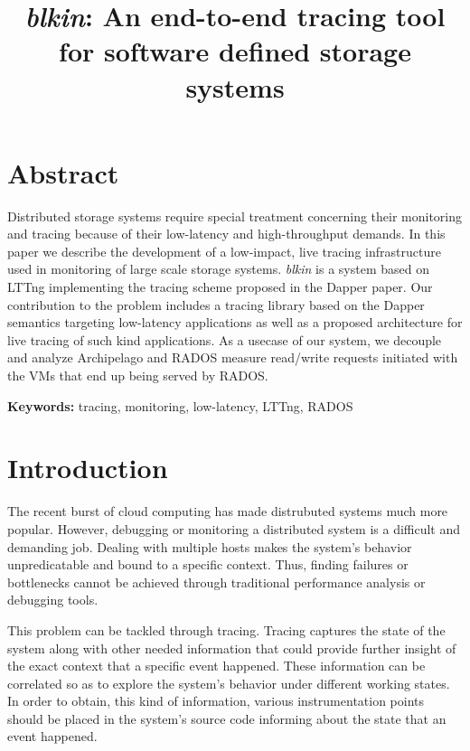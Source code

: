 \documentclass[a4paper,10pt,twocolumn]{article}
\begin{document}
\title{\emph{blkin}: An end-to-end tracing tool for software defined storage 
systems}
\date{}
\maketitle

\section*{Abstract}
Distributed storage systems require special treatment concerning their 
monitoring and tracing because of their low-latency and high-throughput demands.
In this paper we describe the development of a low-impact, live tracing 
infrastructure used in monitoring of large scale storage systems. \emph{blkin}
is a system based on LTTng\cite{lttng} implementing the tracing scheme proposed
in the Dapper paper\cite{dapper}. Our contribution to the problem includes a 
tracing library based on the Dapper semantics targeting low-latency applications
as well as a proposed architecture for live tracing of such kind applications.
As a usecase of our system, we decouple and analyze Archipelago\cite{archip} and
RADOS\cite{rados} measure read/write requests initiated with the VMs that end up
being served by RADOS.


\textbf{Keywords: } tracing, monitoring, low-latency, LTTng, RADOS

\section{Introduction}

The recent burst of cloud computing has made distrubuted systems much more 
popular. However, debugging or monitoring a distributed system is a difficult 
and demanding job. Dealing with multiple hosts makes the system's behavior 
unpredicatable and bound to a specific context. Thus, finding failures
or bottlenecks cannot be achieved through traditional performance analysis or 
debugging tools. 

This problem can be tackled through tracing. Tracing captures the state of the
system along with other needed information that could provide further insight of
the exact context that a specific event happened. These information can be 
correlated so as to explore the system's behavior under different working 
states. In order to obtain, this kind of information, various instrumentation
points should be placed in the system's source code informing about the state
that an event happened.
\end{document}

